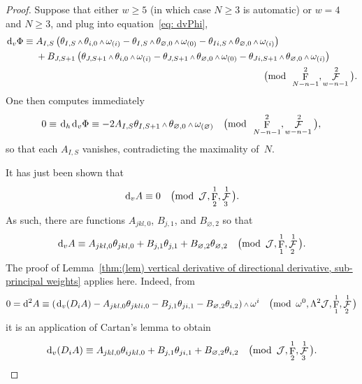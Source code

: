 \documentclass[pdftex]{sigma}
\renewcommand{\d}{{\rm d}}
\renewcommand{\mod}[1]{\quad\big(\mathrm{mod\enspace} #1\big)}
\newcommand{\w}{{\mathchoice{\,{\scriptstyle\wedge}\,}{{\scriptstyle\wedge}}
 {{\scriptscriptstyle\wedge}}{{\scriptscriptstyle\wedge}}}}
\newcommand{\thetas}[1]{\theta_{#1}}
\newcommand{\thetanot}{\thetas{\varnothing,0}}
\newcommand{\omegas}[1]{\omega_{(#1)}}
\DeclareMathOperator{\pwf}{F}
\DeclareMathOperator{\swf}{\mathcal{F}}
\renewcommand{\dh}{\ensuremath{\hspace{1pt} \d_h}}
\newcommand{\dv}{\ensuremath{\hspace{1pt} \d_v}}
\newcommand{\cartTheta}{\mathcal{J}}
\numberwithin{equation}{section}
\begin{document}
\begin{proof}
 Suppose that either $w \ge 5$ (in which case $N \ge 3$ is automatic) or $w = 4$ and $N \ge 3$, and plug into equation~\eqref{eq: dvPhi},
 \begin{align*}
 \dv\Phi \equiv{}&{ }A_{I,S}\left(\thetas{I,S}\w\thetas{i,0}\w\omegas{i} - \thetas{I,S}\w\thetanot\w\omegas{0} - \thetas{Ii,S}\w\thetas{\varnothing,0}\w\omegas{i}\right) \\
 & + B_{J,S+1}\left(\thetas{J,S+1}\w\thetas{i,0}\w\omegas{i} - \thetas{J,S+1}\w\thetanot\w\omegas{0} - \thetas{Ji,S+1}\w\thetas{\varnothing,0}\w\omegas{i}\right) \\
 & \hspace*{82mm}\mod{\pwf^2_{N-n-1}, \swf^2_{w-n-1}} .
 \end{align*}
 One then computes immediately
 \begin{gather*}
 0 \equiv \dh\dv\Phi \equiv -2A_{I,S}\thetas{I,S+1}\w\thetanot\w\omegas{\varnothing} \mod{\pwf^2_{N-n-1}, \swf^2_{w-n-1}} ,
 \end{gather*}
 so that each $A_{I,S}$ vanishes, contradicting the maximality of~$N$.

 It has just been shown that
 \begin{gather*}
 \dv A \equiv 0 \mod{\cartTheta, \pwf^1_2, \swf^1_3} .
 \end{gather*}
 As such, there are functions $A_{jkl,0}$, $B_{j,1}$, and $B_{\varnothing,2}$ so that
 \begin{gather*}
 \dv A \equiv A_{jkl,0}\thetas{jkl,0} + B_{j,1}\thetas{j,1} + B_{\varnothing,2}\thetas{\varnothing,2} \mod{\cartTheta, \pwf^1_{1}, \swf^1_{2}} .
 \end{gather*}
 The proof of Lemma~\ref{thm:(lem) vertical derivative of directional derivative, sub-principal weights} applies here. Indeed, from
 \begin{gather*}
 0 = \d^2 A \equiv (\dv(D_i A) - A_{jkl,0}\thetas{jkli,0} - B_{j,1}\thetas{ji,1} - B_{\varnothing,2}\thetas{i,2})\w\omega^i \mod{\omega^0, \Lambda^2\cartTheta, \pwf^1_{1}, \swf^1_{2}}
 \end{gather*}
 it is an application of Cartan's lemma to obtain
 \begin{gather*}
 \dv(D_i A) \equiv A_{jkl,0}\thetas{ijkl,0} + B_{j,1}\thetas{ji,1} + B_{\varnothing,2}\thetas{i,2} \mod{\cartTheta, \pwf^1_{2}, \swf^1_{3}} .
 \end{gather*}


\end{proof}
\end{document}

